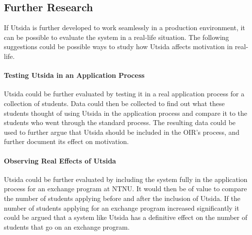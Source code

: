 \subsection{Further Research}

If Utsida is further developed to work seamlessly in a production environment, it can be possible to evaluate the system in a real-life situation. The following suggestions could be possible ways to study how Utsida affects motivation in real-life.

\paragraph{Testing Utsida in an Application Process} Utsida could be further evaluated by testing it in a real application process for a collection of students. Data could then be collected to find out what these students thought of using Utsida in the application process and compare it to the students who went through the standard process. The resulting data could be used to further argue that Utsida should be included in the OIR's process, and further document its effect on motivation.

\paragraph{Observing Real Effects of Utsida} Utsida could be further evaluated by including the system fully in the application process for an exchange program at NTNU. It would then be of value to compare the number of students applying before and after the inclusion of Utsida. If the number of students applying for an exchange program increased significantly it could be argued that a system like Utsida has a definitive effect on the number of students that go on an exchange program. 


\cleardoublepage